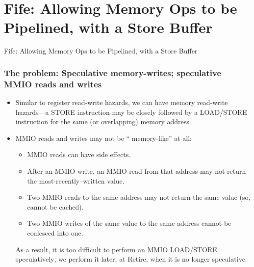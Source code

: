 
\section{Fife: Allowing Memory Ops to be Pipelined, with a Store Buffer}

\begin{frame}

\begin{center}
  {\LARGE Fife: Allowing Memory Ops to be Pipelined, with a Store Buffer}
\end{center}

\end{frame}


\begin{frame}[fragile]
\frametitle{The problem: Speculative memory-writes; speculative MMIO reads and writes}

\footnotesize

\begin{itemize}

 \item Similar to register read-write hazards, we can have memory
       read-write hazards---a STORE instruction may be closely
       followed by a LOAD/STORE instruction for the same (or
       overlapping) memory address.

 \vspace{5ex}

 \item MMIO reads and writes may not be `` memory-like'' at all:

       \begin{itemize}
        \item MMIO reads can have side effects.

        \item After an MMIO write, an MMIO read from that address may
              not return the most-recently--written value.

        \item Two MMIO reads to the same address may not return the
              same value (so, cannot be cached).

        \item Two MMIO writes of the same value to the same address
              cannot be coalesced into one.

       \end{itemize}

       As a result, it is too difficult to perform an MMIO LOAD/STORE
       speculatively; we perform it later, at Retire, when it is no
       longer speculative.

\end{itemize}

\end{frame}

